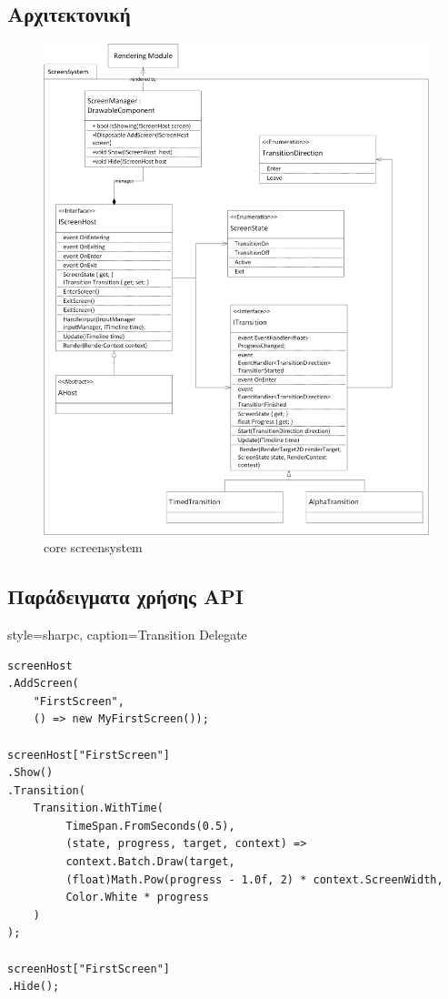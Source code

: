 	\subsection{Αρχιτεκτονική}
	\begin{figure}[h!]	
		\centering
		\includegraphics[width=160mm]{Images/core_screensystem}
		\caption{core screensystem}
		\label{fig:core_screensystem}
	\end{figure}		
	
	\subsection{Παράδειγματα χρήσης API}

	\lstset
	{
		style=sharpc, 
		caption={Transition Delegate}
	}
	\begin{lstlisting}
screenHost
.AddScreen(
	"FirstScreen",
	() => new MyFirstScreen());
		
screenHost["FirstScreen"]
.Show()
.Transition(
	Transition.WithTime(
         TimeSpan.FromSeconds(0.5),
         (state, progress, target, context) =>
         context.Batch.Draw(target, 
         (float)Math.Pow(progress - 1.0f, 2) * context.ScreenWidth, 
         Color.White * progress
    )
);
     
screenHost["FirstScreen"]
.Hide();   
	\end{lstlisting}
